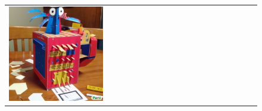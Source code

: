 \begin{figure}[ht!]
\begin{adjustwidth}{-0.8in}{-0.5in}
\begin{tabular}{cccccccccccccccccccc}
\multicolumn{2}{c}{\includegraphics[width=\threebythreecolwidth\textwidth]{figures/cherries/paper3.jpg}} &&


\end{tabular}
\end{adjustwidth}
\end{figure}
